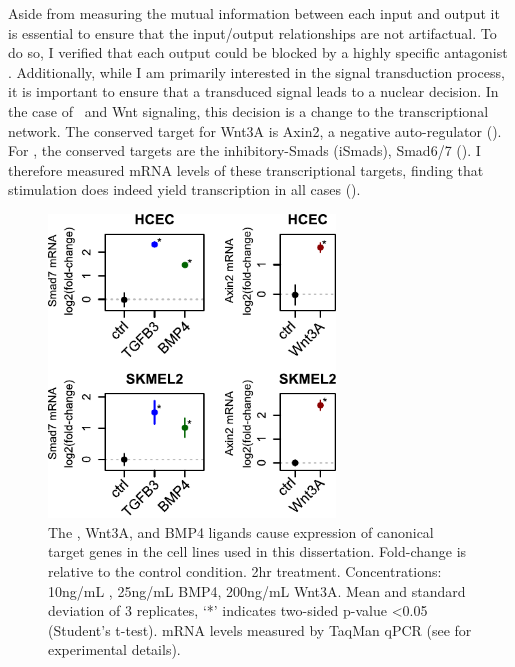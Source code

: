   
Aside from measuring the mutual information between each
input and output it is essential to ensure that
the input/output relationships are not artifactual. To do so, I verified
that each output could be blocked by a highly specific antagonist
. 
Additionally, while I am primarily
interested in the signal transduction process, it is important
to ensure that a transduced signal leads to a nuclear decision.
In the case of \tgfbsf\ and Wnt signaling, this decision is
a change to the transcriptional network. The conserved
target for Wnt3A is Axin2, a negative auto-regulator
(). For \tgfbsf,
the conserved targets are the inhibitory-Smads (iSmads), Smad6/7
(). I therefore measured
mRNA levels of these transcriptional targets,
finding that stimulation does indeed yield transcription
in all cases ().


  \begin{figure}[!bt]
  \centering
  \includegraphics[width=3in]{FIGS/insulation/expression+.pdf}
  {\singlespacing 
  \caption[\tgfbsf\ and Wnt cause canonical target gene expression.]
        { The , Wnt3A, and BMP4 ligands cause
          expression of canonical target genes in the cell lines
          used in this dissertation. Fold-change
          is relative to the control condition. 2hr treatment. Concentrations:
          10ng/mL , 25ng/mL BMP4, 200ng/mL Wnt3A.
          Mean and standard deviation
          of 3 replicates, `*' indicates two-sided p-value <0.05
          (Student's t-test). mRNA levels measured by TaqMan qPCR
          (see  for experimental details).
        }
  \label{fig:insulation:expression}}
  \end{figure}
  
